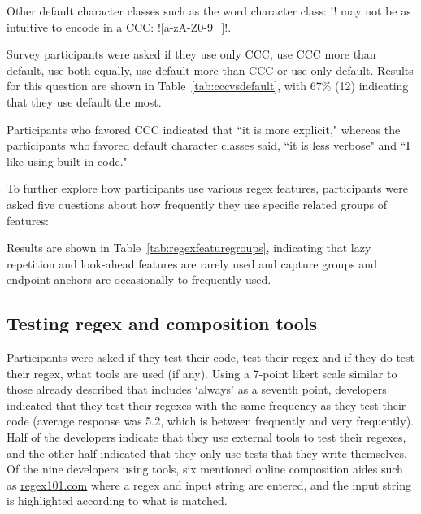 Other default character classes such as the word character class: \cverb!\w! may not be as intuitive to encode in a CCC: \cverb![a-zA-Z0-9_]!.

Survey participants were asked if they use only CCC, use CCC more than default, use both equally, use default more than CCC or use only default.  Results for this question are shown in Table~\ref{tab:cccvsdefault}, with 67\% (12) indicating that they use default the most.

Participants who favored CCC indicated that ``it is more explicit," whereas the participants who favored default character classes said,  ``it is less verbose" and ``I like using built-in code."

To further explore how participants use various regex features, participants were asked five questions about how frequently they use specific related groups of features:

Results are shown in Table~\ref{tab:regexfeaturegroups}, indicating that lazy repetition and look-ahead features are rarely used and capture groups and endpoint anchors are occasionally to frequently used.

\subsection{Testing regex and composition tools}

Participants were asked if they test their code, test their regex and if they do test their regex, what tools are used (if any).  Using a 7-point likert scale similar to those already described that includes `always' as a seventh point, developers indicated that they test their regexes with the same frequency as they test their code (average response was 5.2, which is between frequently and very frequently).  Half of the  developers indicate that they use external tools to test their regexes, and the other half indicated that they only use tests that they write themselves. Of the nine developers using tools, six mentioned online composition aides such as \url{regex101.com} where a regex and input string are entered, and the input string is highlighted according to what is matched.

